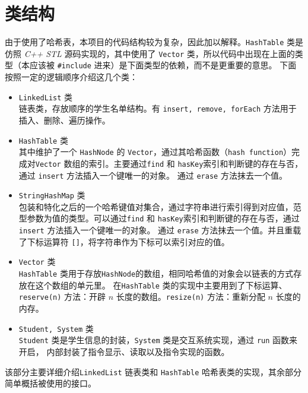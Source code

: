 
\chapter{类结构}
由于使用了哈希表，本项目的代码结构较为复杂，因此加以解释。\lstinline{HashTable} 类是仿照 \emph{C++ STL} 源码实现的，其中使用了%
\lstinline{Vector} 类，所以代码中出现在上面的类型（本应该被 \lstinline{#include} 进来）是下面类型的依赖，而不是更重要的意思。%
下面按照一定的逻辑顺序介绍这几个类：

\begin{itemize}
    \item \lstinline{LinkedList} 类\\
    链表类，存放顺序的学生名单结构。有 \lstinline{insert, remove, forEach} 方法用于插入、删除、遍历操作。
    \item \lstinline{HashTable} 类\\
    其中维护了一个 \lstinline{HashNode} 的 \lstinline{Vector}，通过其哈希函数（\lstinline{hash function}）完成对\lstinline{Vector}%
    数组的索引。主要通过\lstinline{find} 和 \lstinline{hasKey}索引和判断键的存在与否，通过 \lstinline{insert} 方法插入一个键唯一的对象。%
    通过 \lstinline{erase} 方法抹去一个值。
    \item \lstinline{StringHashMap} 类\\
    包装和特化之后的一个哈希键值对集合，通过字符串进行索引得到对应值，范型参数为值的类型。可以通过\lstinline{find} 和 %
    \lstinline{hasKey}索引和判断键的存在与否，通过 \lstinline{insert} 方法插入一个键唯一的对象。%
    通过 \lstinline{erase} 方法抹去一个值。并且重载了下标运算符 \lstinline{[]}，将字符串作为下标可以索引对应的值。
    \item \lstinline{Vector} 类\\
    \lstinline{HashTable} 类用于存放\lstinline{HashNode}的数组，相同哈希值的对象会以链表的方式存放在这个数组的单元里。%
    在\lstinline{HashTable} 类的实现中主要用到了下标运算、\lstinline{reserve(n)} 方法：开辟 $n$ 长度的数组。\lstinline{resize(n)}%
    方法：重新分配 $n$ 长度的内存。
    \item \lstinline{Student, System} 类\\
    \lstinline{Student} 类是学生信息的封装，\lstinline{System} 类是交互系统实现，通过 \lstinline{run} 函数来开启，%
    内部封装了指令显示、读取以及指令实现的函数。
\end{itemize}

该部分主要详细介绍\lstinline{LinkedList} 链表类和 \lstinline{HashTable} 哈希表类的实现，其余部分简单概括被使用的接口。


